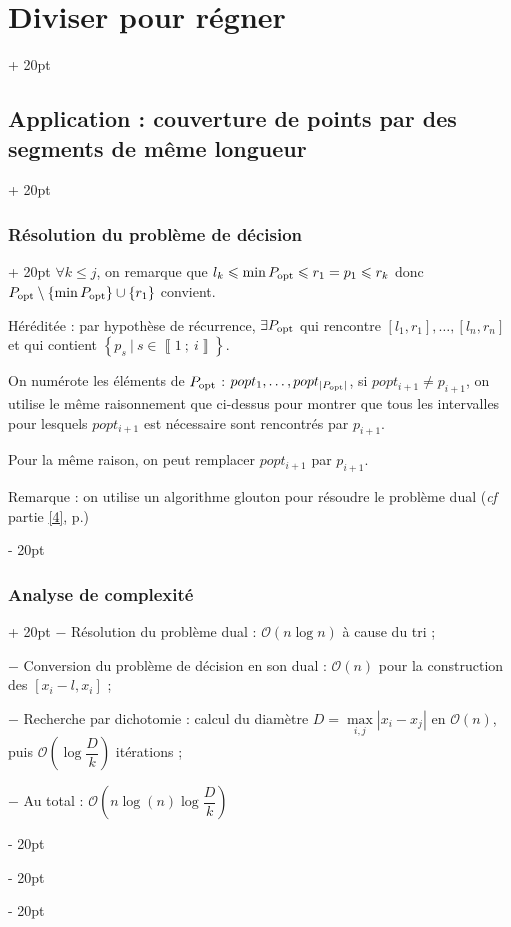 \documentclass[a4paper, 12pt, twoside]{article}
\newcommand{\nset}[2]{\left\llbracket #1\ ;\ #2 \right\rrbracket}
\newcommand{\lr}[1]{\left( #1 \right)}
\newcommand{\set}[1]{\left\{ #1 \right\}}
\newcommand{\abs}[1]{\left\lvert #1 \right\rvert} %
\renewcommand{\le}{\leqslant}
\newcommand{\ind}[1][20pt]{\advance\leftskip + #1}
\newcommand{\deind}[1][20pt]{\advance\leftskip - #1}
\newenvironment{indt}[2][20pt]{#2 \par \ind[#1]}{\par \deind} %
\begin{document}
\begin{indt}{\section{Diviser pour régner}}
\begin{indt}{\subsection{Application : couverture de points par des segments de même longueur}}
\begin{indt}{\subsubsection{Résolution du problème de décision}}
                $\forall k \le j$, on remarque que $l_k \le \min P_{\rm opt} \le r_1 = p_1 \le r_k$ donc $P_{\rm opt} \setminus \set{\min P_{\rm opt}} \cup \set{r_1}$ convient.
                
                \vspace{6pt}
                
                Héréditée : par hypothèse de récurrence, $\exists P_{\rm opt}$ qui rencontre $[l_1, r_1], \ldots, [l_n, r_n]$ et qui contient $\set{p_s\ |\ s \in \nset 1 i}$.
                
                On numérote les éléments de $P_{\rm opt}$ : $popt_1, \ldots, popt_{\abs{P_{\rm opt}}}$, si $popt_{i + 1} \neq p_{i + 1}$, on utilise le même raisonnement que ci-dessus pour montrer que tous les intervalles pour lesquels $popt_{i + 1}$ est nécessaire sont rencontrés par $p_{i + 1}$.
                
                Pour la même raison, on peut remplacer $popt_{i + 1}$ par $p_{i + 1}$.
                
                \vspace{12pt}
                
                Remarque : on utilise un algorithme glouton pour résoudre le problème dual (\textit{cf} partie \ref{4}, p.\pageref{4})
            \end{indt}
            
            \vspace{12pt}
            
            \begin{indt}{\subsubsection{Analyse de complexité}}
                $-$ Résolution du problème dual : $\mathcal O(n\log n)$ à cause du tri ;
                
                $-$ Conversion du problème de décision en son dual : $\mathcal O(n)$ pour la construction des $[x_i - l, x_i]$ ;
                
                $-$ Recherche par dichotomie : calcul du diamètre $D = \max\limits_{i, j}\abs{x_i - x_j}$ en $\mathcal O(n)$, puis $\mathcal O\lr{\log \dfrac D k}$ itérations ;
                
                $-$ Au total : $\mathcal O\lr{n\log(n) \log \dfrac D k}$
            \end{indt}
        \end{indt}
        
    \end{indt}
    
\end{document}
